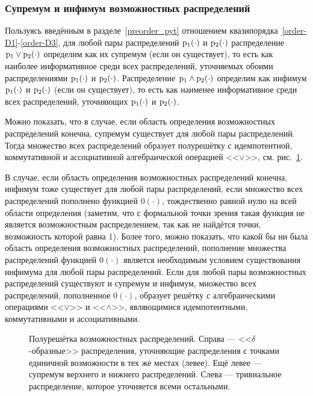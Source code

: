 \subsubsection{Супремум и инфимум возможностных распределений}
\label{inf_sup_poss}
Пользуясь введённым в разделе~\ref{preorder_pyt} отношением квазипорядка~\ref{order-D1}-\ref{order-D3}, для любой пары распределений ${\mathrm{p}}_1(\cdot)$ и ${\mathrm{p}}_2(\cdot)$ распределение ${\mathrm{p}}_1\vee{\mathrm{p}}_2(\cdot)$ определим как их супремум (если он существует), то есть как наиболее информативное среди всех распределений, уточняемых обоими распределениями ${\mathrm{p}}_1(\cdot)$ и ${\mathrm{p}}_2(\cdot)$. Распределение ${\mathrm{p}}_1\wedge{\mathrm{p}}_2(\cdot)$ определим как инфимум ${\mathrm{p}}_1(\cdot)$ и ${\mathrm{p}}_2(\cdot)$ (если он существует), то есть как наименее информативное среди всех распределений, уточняющих ${\mathrm{p}}_1(\cdot)$ и ${\mathrm{p}}_2(\cdot)$.

Можно показать, что в случае, если область определения возможностных распределений конечна, супремум существует для любой пары распределений.  Тогда множество всех распределений образует полурешётку с идемпотентной, коммутативной и ассоциативной алгебраической операцией <<$\vee$>>, см. рис.~\ref{ris:half_lattice}. 
\begin{notice}
В случае, если область определения возможностных распределений конечна, инфимум тоже существует для любой пары распределений, если множество всех распределений пополнено функцией $0(\cdot)$, тождественно равной нулю на всей области определения (заметим, что с формальной точки зрения такая функция не является возможностным распределением, так как не найдётся точки, возможность которой равна 1). Более того, можно показать, что какой бы ни была область определения возможностных распределений, пополнение множества распределений функцией $0(\cdot)$ является необходимым условием существования инфимума для любой пары распределений. Если для любой пары возможностных распределений существуют и супремум и инфимум, множество всех распределений, пополненное $0(\cdot)$, образует решётку с алгебраическими операциями <<$\vee$>> и <<$\wedge$>>, являющимися идемпотентными, коммутативными и ассоциативными.
\end{notice}

\begin{figure}[h]
\caption{\small Полурешётка возможностных распределений. Справа --- <<$\delta$-образные>> распределения, уточняющие распределения с точками единичной возможности в тех же местах (левее). Ещё левее --- супремум верхнего и нижнего распределений. Слева --- тривиальное распределение, которое уточняется всеми остальными. }
\label{ris:half_lattice}
\end{figure}

